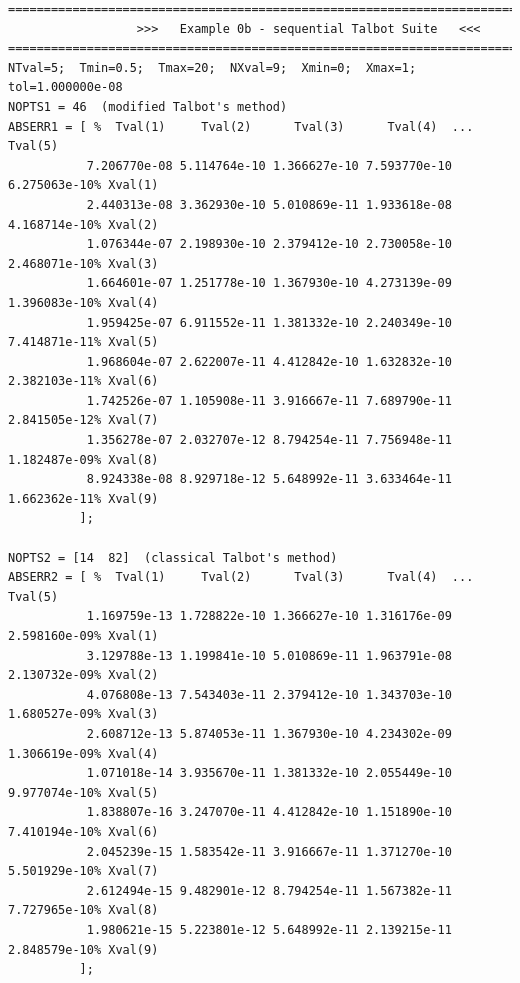\documentclass[a4paper,10pt]{report}%
\begin{document}
\begin{lstlisting}
====================================================================================
                  >>>   Example 0b - sequential Talbot Suite   <<<
====================================================================================
NTval=5;  Tmin=0.5;  Tmax=20;  NXval=9;  Xmin=0;  Xmax=1;  tol=1.000000e-08
NOPTS1 = 46  (modified Talbot's method)
ABSERR1 = [ %  Tval(1)     Tval(2)      Tval(3)      Tval(4)  ... Tval(5)
           7.206770e-08 5.114764e-10 1.366627e-10 7.593770e-10 6.275063e-10% Xval(1)
           2.440313e-08 3.362930e-10 5.010869e-11 1.933618e-08 4.168714e-10% Xval(2)
           1.076344e-07 2.198930e-10 2.379412e-10 2.730058e-10 2.468071e-10% Xval(3)
           1.664601e-07 1.251778e-10 1.367930e-10 4.273139e-09 1.396083e-10% Xval(4)
           1.959425e-07 6.911552e-11 1.381332e-10 2.240349e-10 7.414871e-11% Xval(5)
           1.968604e-07 2.622007e-11 4.412842e-10 1.632832e-10 2.382103e-11% Xval(6)
           1.742526e-07 1.105908e-11 3.916667e-11 7.689790e-11 2.841505e-12% Xval(7)
           1.356278e-07 2.032707e-12 8.794254e-11 7.756948e-11 1.182487e-09% Xval(8)
           8.924338e-08 8.929718e-12 5.648992e-11 3.633464e-11 1.662362e-11% Xval(9)
          ];

NOPTS2 = [14  82]  (classical Talbot's method)
ABSERR2 = [ %  Tval(1)     Tval(2)      Tval(3)      Tval(4)  ... Tval(5)
           1.169759e-13 1.728822e-10 1.366627e-10 1.316176e-09 2.598160e-09% Xval(1)
           3.129788e-13 1.199841e-10 5.010869e-11 1.963791e-08 2.130732e-09% Xval(2)
           4.076808e-13 7.543403e-11 2.379412e-10 1.343703e-10 1.680527e-09% Xval(3)
           2.608712e-13 5.874053e-11 1.367930e-10 4.234302e-09 1.306619e-09% Xval(4)
           1.071018e-14 3.935670e-11 1.381332e-10 2.055449e-10 9.977074e-10% Xval(5)
           1.838807e-16 3.247070e-11 4.412842e-10 1.151890e-10 7.410194e-10% Xval(6)
           2.045239e-15 1.583542e-11 3.916667e-11 1.371270e-10 5.501929e-10% Xval(7)
           2.612494e-15 9.482901e-12 8.794254e-11 1.567382e-11 7.727965e-10% Xval(8)
           1.980621e-15 5.223801e-12 5.648992e-11 2.139215e-11 2.848579e-10% Xval(9)
          ];


\end{lstlisting}
\end{document}
